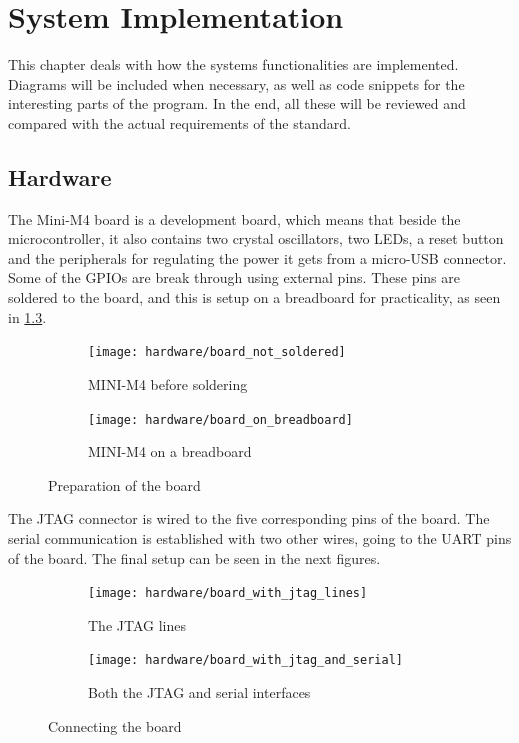 
\newcommand{\excreturn}{EXC\_RETURN}

\chapter{System Implementation}
This chapter deals with how the system\textquotesingle s functionalities 
are implemented. Diagrams will be included when necessary, as well as code 
snippets for the interesting parts of the program. In the end, all these
will be reviewed and compared with the actual requirements of the standard.

\section{Hardware}
The Mini-M4 board is a development board, which means that beside the 
microcontroller, it also contains two crystal oscillators, two LEDs, a reset 
button and the peripherals for regulating the power it gets from
a micro-USB connector.
Some of the GPIOs are break through using external pins.
These pins are soldered to the board, and this is setup on a breadboard
for practicality, as seen in \ref{fig:photo1}.

\begin{figure}[H]
\begin{subfigure}{0.5\textwidth}
  \centering
  \texttt{[image: hardware/board\_not\_soldered]}
  \caption{MINI-M4 before soldering}
  \label{fig:sub1}
\end{subfigure}%
\begin{subfigure}{0.5\textwidth}
  \centering
  \texttt{[image: hardware/board\_on\_breadboard]}
  \caption{MINI-M4 on a breadboard}
  \label{fig:sub2}
\end{subfigure}
\caption{Preparation of the board}
\label{fig:photo1}
\end{figure}

The JTAG connector is wired to the five corresponding pins of the
board. The serial communication is established with two other wires, going
to the UART pins of the board.
The final setup can be seen in the next figures.

\begin{figure}[H]
\centering
\begin{subfigure}{.5\textwidth}
  \centering
  \texttt{[image: hardware/board\_with\_jtag\_lines]}
  \caption{The JTAG lines}
  \label{fig:sub1}
\end{subfigure}%
\begin{subfigure}{.5\textwidth}
  \centering
  \texttt{[image: hardware/board\_with\_jtag\_and\_serial]}
  \caption{Both the JTAG and serial interfaces}
  \label{fig:sub2}
\end{subfigure}
\caption{Connecting the board}
\label{fig:photo2}
\end{figure}


